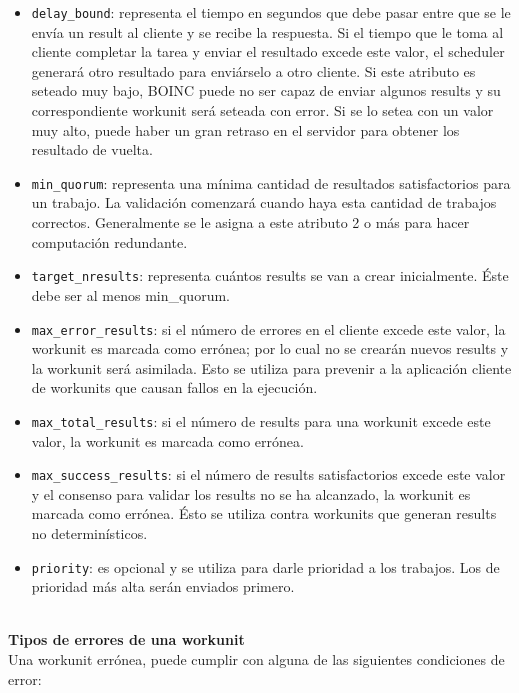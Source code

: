 \begin{itemize}
\item \texttt{delay\_bound}: representa el tiempo en segundos que debe pasar entre que se le envía un result al cliente y se recibe la respuesta. Si el tiempo que le toma al cliente completar la tarea y enviar el resultado excede este valor, el scheduler generará otro resultado para enviárselo a otro cliente. Si este atributo es seteado muy bajo, BOINC puede no ser capaz de enviar algunos results y su correspondiente workunit será seteada con error. Si se lo setea con un valor muy alto, puede haber un gran retraso en el servidor para obtener los resultado de vuelta.
\item \texttt{min\_quorum}: representa una mínima cantidad de resultados satisfactorios para un trabajo. La validación comenzará cuando haya esta cantidad de trabajos correctos. Generalmente se le asigna a este atributo 2 o más para hacer computación redundante.
\item \texttt{target\_nresults}: representa cuántos results se van a crear inicialmente. Éste debe ser al menos min\_quorum.
\item \texttt{max\_error\_results}: si el número de errores en el cliente excede este valor, la workunit es marcada como errónea; por lo cual no se crearán nuevos results y la workunit será asimilada. Esto se utiliza para prevenir a la aplicación cliente de workunits que causan fallos en la ejecución.
\item \texttt{max\_total\_results}: si el número de results para una workunit excede este valor, la workunit es marcada como errónea.
\item \texttt{max\_success\_results}: si el número de results satisfactorios excede este valor y el consenso para validar los results no se ha alcanzado, la workunit es marcada como errónea. Ésto se utiliza contra workunits que generan results no determinísticos.
\item \texttt{priority}: es opcional y se utiliza para darle prioridad a los trabajos. Los de prioridad más alta serán enviados primero.
\end{itemize}
\newpage
\textbf{\\Tipos de errores de una workunit}\\

Una workunit errónea, puede cumplir con alguna de las siguientes condiciones de error:

